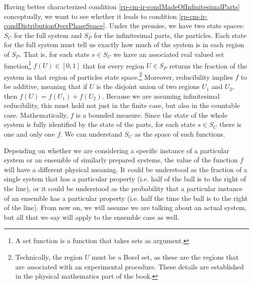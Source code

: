 Having better characterized condition \ref{rp-cm-ir-condMadeOfInfinitesimalParts} conceptually, we want to see whether it leads to condition \ref{rp-cm-ir-condDistributionOverPhaseSpace}. Under the premise, we have two state spaces: $S_C$ for the full system and $S_P$ for the infinitesimal parts, the particles. Each state for the full system must tell us exactly how much of the system is in each region of $S_P$. That is, for each state $s \in S_C$ we have an associated real valued set function\footnote{A set function is a function that takes sets as argument.} $f(U) \in [0,1]$ that for every region $U \in S_P$ returns the fraction of the system in that region of particles state space.\footnote{Technically, the region $U$ must be a Borel set, as these are the regions that are associated with an experimental procedure. These details are established in the physical mathematics part of the book.} Moreover, reducibility implies $f$ to be additive, meaning that if $U$ is the disjoint union of two regions $U_1$ and $U_2$, then $f(U) = f(U_1) + f(U_2)$. Because we are assuming infinitesimal reducibility, this must hold not just in the finite case, but also in the countable case. Mathematically, $f$ is a bounded measure. Since the state of the whole system is fully identified by the state of the parts, for each state $s \in S_C$ there is one and only one $f$. We can understand $S_C$ as the space of such functions.

Depending on whether we are considering a specific instance of a particular system or an ensemble of similarly prepared systems, the value of the function $f$ will have a different physical meaning. It could be understood as the fraction of a single system that has a particular property (i.e. half of the ball is to the right of the line), or it could be understood as the probability that a particular instance of an ensemble has a particular property (i.e. half the time the ball is to the right of the line). From now on, we will assume we are talking about an actual system, but all that we say will apply to the ensemble case as well.

